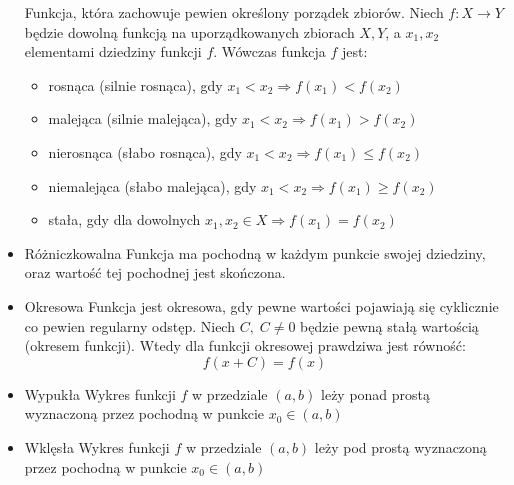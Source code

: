 \documentclass[14pt,a4paper]{extarticle}
\begin{document}
\begin{itemize}
      Funkcja, która zachowuje pewien określony porządek zbiorów. Niech $f:X\rightarrow Y$ będzie
      dowolną funkcją na uporządkowanych zbiorach $X, Y$, a $x_{1}, x_{2}$ elementami dziedziny funkcji $f$.
      Wówczas funkcja $f$ jest:
      \begin{itemize}
         \item rosnąca (silnie rosnąca), gdy $x_{1} < x_{2} \Rightarrow f(x_{1}) < f(x_{2})$
         \item malejąca (silnie malejąca), gdy $x_{1} < x_{2} \Rightarrow f(x_{1}) > f(x_{2})$
         \item nierosnąca (słabo rosnąca), gdy $x_{1} < x_{2} \Rightarrow f(x_{1}) \leq f(x_{2})$
         \item niemalejąca (słabo malejąca), gdy $x_{1} < x_{2} \Rightarrow f(x_{1}) \geq f(x_{2})$
         \item stała, gdy dla dowolnych $x_{1}, x_{2} \in X \Rightarrow f(x_{1}) = f(x_{2})$
      \end{itemize}
   \item Różniczkowalna\hfill\break
      Funkcja ma pochodną w każdym punkcie swojej dziedziny, oraz wartość tej pochodnej jest skończona.
   \item Okresowa\hfill\break
      Funkcja jest okresowa, gdy pewne wartości pojawiają się cyklicznie co pewien regularny odstęp.
      Niech $C, \;C \neq 0$ będzie pewną stałą wartością (okresem funkcji). Wtedy dla funkcji okresowej prawdziwa jest równość:
      $$f(x + C) = f(x)$$
   \item Wypukła\hfill\break
      Wykres funkcji $f$ w przedziale $(a, b)$ leży ponad prostą wyznaczoną przez pochodną w punkcie $x_{0} \in (a, b)$
   \item Wklęsła\hfill\break
      Wykres funkcji $f$ w przedziale $(a, b)$ leży pod prostą wyznaczoną przez pochodną w punkcie $x_{0} \in (a, b)$
\end{itemize}
\end{document}
